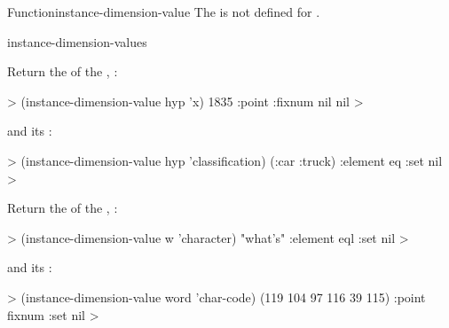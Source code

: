 \documentclass[10pt,twoside,english,pdftex]{article}
\begin{document}
\begin{functiondoc}{Function}{instance-dimension-value}
\fnerrors The   is not defined for
. 

\begin{alsos}{instance-dimension-values}
\also[dimensions-of]
\end{alsos}

\fnexamples
%
Return the   of the ,
:
%
\W\supp
\begin{example}
  > (instance-dimension-value hyp 'x)
  1835
  :point
  :fixnum
  nil
  nil
  >
\end{example}
%
and its  :
%
\W\supp\notpretop
\begin{example}
  > (instance-dimension-value hyp 'classification)
  (:car :truck)
  :element
  eq
  :set
  nil
  >
\end{example}

Return the   of the
, :
%
\W\supp
\begin{example}
  > (instance-dimension-value w 'character)
  "what's"
  :element
  eql
  :set
  nil
  >
\end{example}
%
and its  :
%
\W\supp\notpretop
\begin{example}
  > (instance-dimension-value word 'char-code)
  (119 104 97 116 39 115)
  :point
  fixnum
  :set
  nil
  >
\end{example}

\end{functiondoc}

\end{document}
